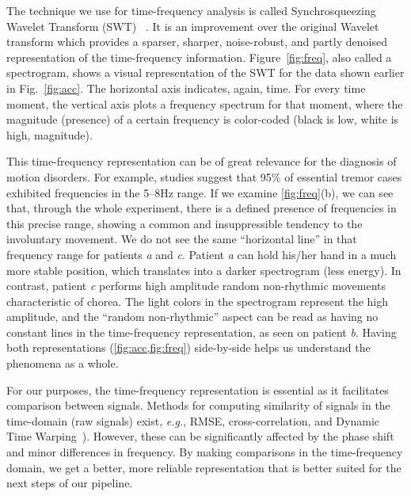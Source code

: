 The technique we use for time-frequency analysis is called Synchrosqueezing Wavelet Transform (SWT)~ \citep{MIHALEC2016324}. It is an improvement over the original Wavelet transform \citep{wavelet} which provides a sparser, sharper, noise-robust, and partly denoised representation of the time-frequency information. Figure~\ref{fig:freq}, also called a spectrogram, shows a visual representation of the SWT for the data shown earlier in Fig.~\ref{fig:acc}. The horizontal axis indicates, again, time. For every time moment, the vertical axis plots a frequency spectrum for that moment, where the magnitude (presence) of a certain frequency is color-coded (black is low, white is high, magnitude).

This time-frequency representation can be of great relevance for the diagnosis of motion disorders. For example, studies suggest that 95\% of essential tremor cases exhibited frequencies in the 5--8Hz range. If we examine \cref{fig:freq}(b), we can see that,  through the whole experiment, there is a defined presence of frequencies in this precise range, showing a common and insuppressible tendency to the involuntary movement. We do not see the same ``horizontal line'' in that frequency range for patients \textit{a} and \textit{c}. Patient \textit{a} can hold his/her hand in a much more stable position, which translates into a darker spectrogram (less energy). In contrast, patient \textit{c} performs high amplitude random non-rhythmic movements characteristic of chorea. The light colors in the spectrogram represent the high amplitude, and the ``random non-rhythmic'' aspect can be read as having no constant lines in the time-frequency representation, as seen on patient \textit{b}. Having both representations (\cref{fig:acc,fig:freq}) side-by-side helps us understand the phenomena as a whole. 

For our purposes, the time-frequency representation is essential as it facilitates comparison between signals. Methods for computing similarity of signals in the time-domain (raw signals) exist, \emph{e.g.}, RMSE, cross-correlation, and Dynamic Time Warping~\citep{Gupta1996}). However, these can be significantly affected by the phase shift and minor differences in frequency. By making comparisons in the time-frequency domain, we get a better, more reliable representation that is better suited for the next steps of our pipeline.

